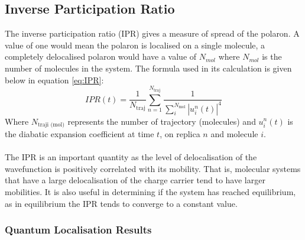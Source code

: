 \subsection{Inverse Participation Ratio}
The inverse participation ratio (IPR) gives a measure of spread of the polaron. A value of one would mean the polaron is localised on a single molecule, a completely delocalised polaron would have a value of $N_{mol}$ where $N_{mol}$ is the number of molecules in the system. The formula used in its calculation is given below in equation \eqref{eq:IPR}:
\begin{equation}
  IPR(t) = \frac{1}{N_{\text{traj}}} \sum_{n=1}^{N_{\text{traj}}} \frac{1}{\sum_{i}^{N_{\text{mol}}} \left| u_{i}^{n}(t) \right|^4}
  \label{eq:IPR}
\end{equation}
Where $N_{\text{traji (mol)}}$ represents the number of trajectory (molecules) and $u_{i}^{n}(t)$ is the diabatic expansion coefficient at time $t$, on replica $n$ and molecule $i$. 
\\\\
The IPR is an important quantity as the level of delocalisation of the wavefunction is positively correlated with its mobility. That is, molecular systems that have a large delocalisation of the charge carrier tend to have larger mobilities. It is also useful in determining if the system has reached equilibrium, as in equilibrium the IPR tends to converge to a constant value.
\subsubsection{Quantum Localisation Results}


